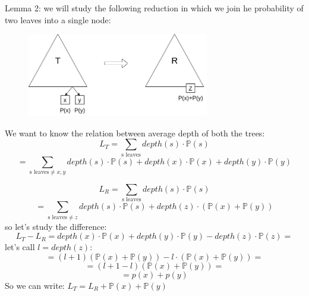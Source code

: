 Lemma 2: we will study the following reduction in which we join he probability of two leaves into a single node:
\begin{figure}[H]
    \centering
    \includegraphics[width=300px]{images/10_Data_compression/huffman_lemma_2.png}
\end{figure}
We want to know the relation between average depth of both the trees:
$$
    L_T = \sum_{\text{s leaves}} depth(s) \cdot \mathbb{P}(s)
$$
$$
    = \sum_{\text{s leaves} \neq x,y} depth(s) \cdot \mathbb{P}(s) + depth(x) \cdot \mathbb{P}(x) + depth(y) \cdot \mathbb{P}(y)
$$

$$
    L_R = \sum_{\text{s leaves}} depth(s) \cdot \mathbb{P}(s)
$$
$$
    = \sum_{\text{s leaves} \neq z} depth(s) \cdot \mathbb{P}(s) + depth(z) \cdot (\mathbb{P}(x) + \mathbb{P}(y))
$$
so let's study the difference:
$$
    L_T - L_R = depth(x) \cdot \mathbb{P}(x) + depth(y) \cdot \mathbb{P}(y) - depth(z) \cdot \mathbb{P}(z) =
$$
let's call $l = depth(z)$:
$$
    = (l+1)(\mathbb{P}(x)+\mathbb{P}(y)) - l\cdot(\mathbb{P}(x)+\mathbb{P}(y)) = 
$$
$$
    = (l+1 - l)(\mathbb{P}(x)+\mathbb{P}(y)) = 
$$
$$
    = p(x)+p(y) 
$$
So we can write: $L_T = L_R + \mathbb{P}(x) + \mathbb{P}(y)$

